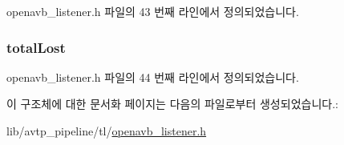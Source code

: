 openavb\+\_\+listener.\+h 파일의 43 번째 라인에서 정의되었습니다.

\subsubsection[{\texorpdfstring{total\+Lost}{totalLost}}]{ total\+Lost}\hypertarget{structlistener__stats__t_a4e376afa9361ab883797552591108182}{}\label{structlistener__stats__t_a4e376afa9361ab883797552591108182}


openavb\+\_\+listener.\+h 파일의 44 번째 라인에서 정의되었습니다.



이 구조체에 대한 문서화 페이지는 다음의 파일로부터 생성되었습니다.\+:\begin{DoxyCompactItemize}
\item 
lib/avtp\+\_\+pipeline/tl/\hyperlink{openavb__listener_8h}{openavb\+\_\+listener.\+h}\end{DoxyCompactItemize}
